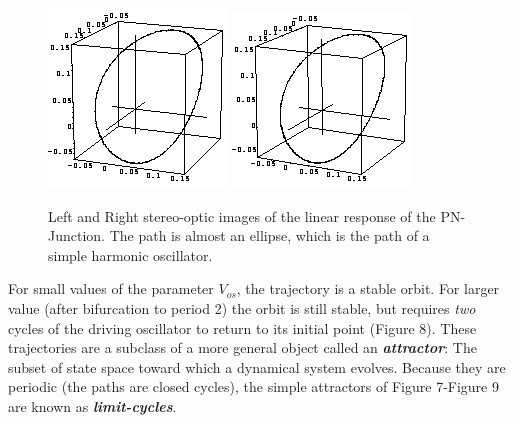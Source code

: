 \documentclass{../lab}
\begin{document}
\begin{figure}
    \centering
    \href{http://experimentationlab.berkeley.edu/sites/default/files/images/Nldimage042.gif}{\includegraphics[width=0.33\linewidth,keepaspectratio]{images/Nldimage042.png}}
    \href{http://experimentationlab.berkeley.edu/sites/default/files/images/Nldimage043.gif}{\includegraphics[width=0.33\linewidth,keepaspectratio]{images/Nldimage043.png}}
    \caption{Left and Right stereo-optic images of the linear response of the PN-Junction. The path is almost an ellipse, which is the path of a simple harmonic oscillator.}
    \label{fig:my_label}
\end{figure}

For small values of the parameter $V_{os}$, the trajectory is a stable orbit. For larger value (after bifurcation to period 2) the orbit is still stable, but requires \emph{two} cycles of the driving oscillator to return to its initial point (Figure 8). These trajectories are a subclass of a more general object called an \emph{\textbf{attractor}}: The subset of state space toward which a dynamical system evolves. Because they are periodic (the paths are closed cycles), the simple attractors of Figure 7-Figure 9 are known as \emph{\textbf{limit-cycles}}.
\end{document}
